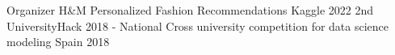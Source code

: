 


\begin{cvhonors}

  \cvhonor
    {Organizer} %
    {H\&M Personalized Fashion Recommendations
} %
    {Kaggle} %
    {2022} %
  \cvhonor
    {2nd} %
    {UniversityHack 2018 - National Cross university competition for data science modeling} %
    {Spain} %
    {2018} %

\end{cvhonors}